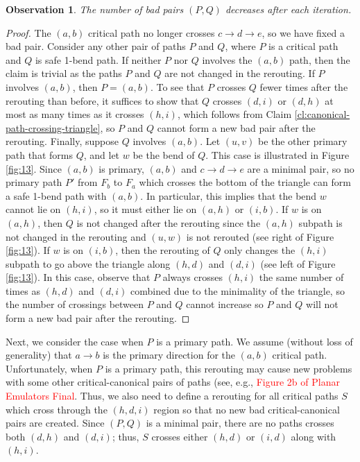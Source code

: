 \documentclass[11pt]{article}
\newtheorem{observation}[theorem]{Observation}
\begin{document}
\begin{observation}\label{obs:bad-pairs-decrease}
    The number of bad pairs $(P,Q)$ decreases after each iteration.
\end{observation}
\begin{proof}
    The $(a,b)$ critical path no longer crosses $c\to d\to e$, so we have fixed a bad pair. Consider any other pair of paths $P$ and $Q$, where $P$ is a critical path and $Q$ is safe 1-bend path. If neither $P$ nor $Q$ involves the $(a,b)$ path, then the claim is trivial as the paths $P$ and $Q$ are not changed in the rerouting. 
    If $P$ involves $(a,b)$, then $P=(a,b)$. To see that $P$ crosses $Q$ fewer times after the rerouting than before, it suffices to show that $Q$ crosses $(d,i)$ or $(d,h)$ at most as many times as it crosses $(h,i)$, which follows from Claim \ref{cl:canonical-path-crossing-triangle}, so $P$ and $Q$ cannot form a new bad pair after the rerouting.
%
    Finally, suppose $Q$ involves $(a,b)$. Let $(u,v)$ be the other primary path that forms $Q$, and let $w$ be the bend of $Q$. This case is illustrated in Figure \ref{fig:13}. Since $(a,b)$ is primary, $(a,b)$ and $c\to d\to e$ are a minimal pair, so no primary path $P'$ from $F_b$ to $F_a$ which crosses the bottom of the triangle can form a safe 1-bend path with $(a,b)$. In particular, this implies that the bend $w$ cannot lie on $(h,i)$, so it must either lie on $(a,h)$ or $(i,b)$. If $w$ is on $(a,h)$, then $Q$ is not changed after the rerouting since the $(a,h)$ subpath is not changed in the rerouting and $(u,w)$ is not rerouted (see right of Figure \ref{fig:13}). If $w$ is on $(i,b)$, then the rerouting of $Q$ only changes the $(h,i)$ subpath to go above the triangle along $(h,d)$ and $(d,i)$ (see left of Figure \ref{fig:13}). In this case, observe that $P$ always crosses $(h,i)$ the same number of times as $(h,d)$ and $(d,i)$ combined due to the minimality of the triangle, so the number of crossings between $P$ and $Q$ cannot increase so $P$ and $Q$ will not form a new bad pair after the rerouting.
\end{proof}





\iffalse
Next, we consider the case when $P$ is a primary path. We assume (without loss of generality) that $a\to b$ is the primary direction for the $(a,b)$ critical path. Unfortunately, when $P$ is a primary path, this rerouting may cause new problems with some other critical-canonical pairs of paths (see, e.g., \textcolor{red}{Figure 2b of Planar Emulators Final}. Thus, we also need to define a rerouting for all critical paths $S$ which cross through the $(h,d,i)$ region so that no new bad critical-canonical pairs are created. Since $(P,Q)$ is a minimal pair, there are no paths crosses both $(d,h)$ and $(d,i)$; thus, $S$ crosses either $(h,d)$ or $(i,d)$ along with $(h,i)$.
\end{document}
